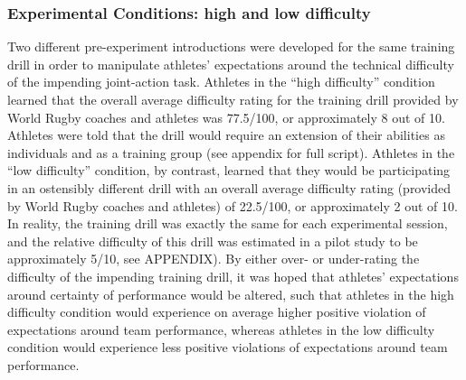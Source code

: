 \documentclass[english]{article}\usepackage[]{graphicx}\usepackage[]{color}
\begin{document}




\subsubsection{Experimental Conditions: high and low difficulty}

Two different pre-experiment introductions were developed for the same training drill in order to manipulate athletes’ expectations around the technical difficulty of the impending joint-action task.  Athletes in the ``high difficulty'' condition learned that the overall average difficulty rating for the training drill provided by World Rugby coaches and athletes was 77.5/100, or approximately 8 out of 10.  Athletes were told that the drill would require an extension of their abilities as individuals and as a training group (see appendix for full script).  Athletes in the ``low difficulty'' condition, by contrast, learned that they would be participating in an ostensibly different drill with an overall average difficulty rating (provided by World Rugby coaches and athletes) of 22.5/100, or approximately 2 out of 10.  In reality, the training drill was exactly the same for each experimental session, and the relative difficulty of this drill was estimated in a pilot study to be approximately 5/10, see APPENDIX).  By either over- or under-rating the difficulty of the impending training drill, it was hoped that athletes' expectations around certainty of performance would be altered, such that athletes in the high difficulty condition would experience on average higher positive violation of expectations around team performance, whereas athletes in the low difficulty condition would experience less positive violations of expectations around team performance.
\end{document}
